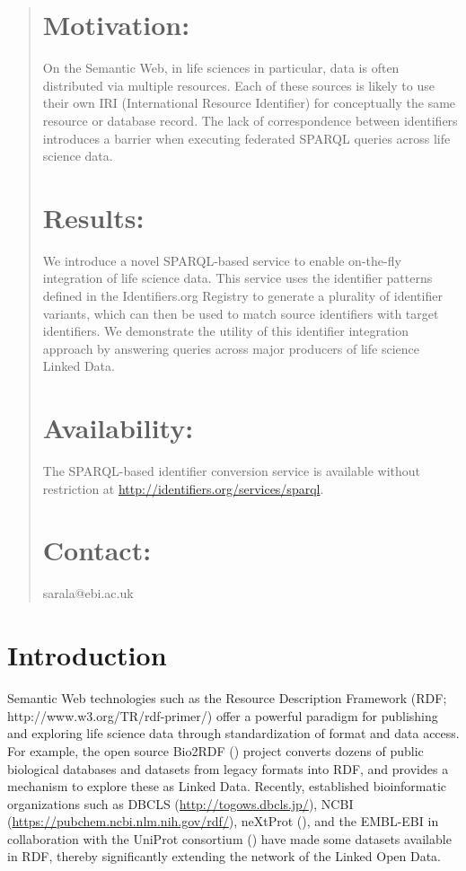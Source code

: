 \documentclass{bioinfo}
\begin{document}
\begin{abstract}
\section{Motivation:}
On the Semantic Web, in life sciences in particular, data is often distributed via multiple resources. Each of these sources is likely to use their own IRI (International Resource Identifier) for conceptually the same resource or database record. The lack of correspondence between identifiers introduces a barrier when executing federated SPARQL queries across life science data.

\section{Results:}
We introduce a novel SPARQL-based service to enable on-the-fly integration of life science data. This service uses the identifier patterns defined in the Identifiers.org Registry to generate a plurality of identifier variants, which can then be used to match source identifiers with target identifiers. We demonstrate the utility of this identifier integration approach by answering queries across major producers of life science Linked Data.

\section{Availability:}
The SPARQL-based identifier conversion service is available without restriction at \linebreak\href{http://identifiers.org/services/sparql}{http://identifiers.org/services/sparql}.

\section{Contact:} sarala@ebi.ac.uk
\end{abstract}

\section{Introduction}
Semantic Web technologies such as the Resource Description Framework (RDF; http://www.w3.org/TR/rdf-primer/) offer a powerful paradigm for publishing and exploring life science data through standardization of format and data access. For example, the open source Bio2RDF (\cite{Biordf2}) project converts dozens of public biological databases and datasets from legacy formats into RDF, and provides a mechanism to explore these as Linked Data. Recently, established bioinformatic organizations such as DBCLS (\href{http://togows.dbcls.jp/}{http://togows.dbcls.jp/}), NCBI (\href{https://pubchem.ncbi.nlm.nih.gov/rdf/}{https://pubchem.ncbi.nlm.nih.gov/rdf/}), neXtProt (\cite{Chichester2014}), and the EMBL-EBI in collaboration with the UniProt consortium (\cite{Jupp01052014}) have made some datasets available in RDF, thereby significantly extending the network of the Linked Open Data.
\end{document}
